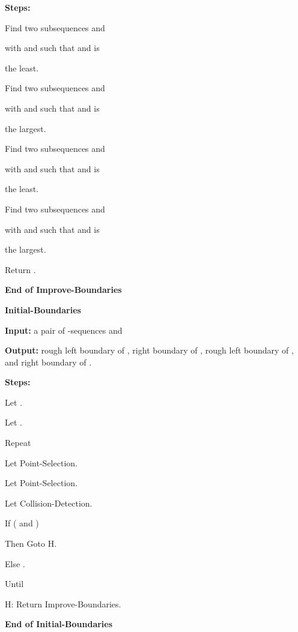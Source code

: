 \documentclass[11pt]{article}
\begin{document}
 {\bf Steps:}








\qquad Find two subsequences  and





\qquad with  and  such
that  and  is

\qquad the least.


\qquad Find two subsequences  and


\qquad with  and 
such that   and   is

\qquad the largest.


\qquad Find two subsequences  and


\qquad with  and  such
that   and  is


\qquad the least.


\qquad Find two subsequences  and


\qquad with  and 
such that   and  is

\qquad  the largest.

\qquad Return .

{\bf End of Improve-Boundaries}







\vskip 10pt {\bf Initial-Boundaries}

{\bf Input:} a pair of -sequences  and


{\bf Output:} rough left boundary  of , right
boundary  of , rough left boundary
 of , and right boundary 
of .


 {\bf Steps:}

\qquad Let .

\qquad Let .

\qquad Repeat


\qquad\qquad Let Point-Selection.

\qquad\qquad Let Point-Selection.

\qquad\qquad Let
Collision-Detection.

\qquad\qquad If ( and
)


\qquad\qquad Then Goto H.

\qquad\qquad Else .

\qquad Until 

\qquad H: Return Improve-Boundaries.



{\bf End of Initial-Boundaries}


\vskip 10pt
\end{document}
